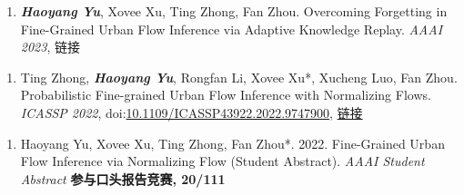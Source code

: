 
\begin{enumerate}[resume]
    \item  \textit{\textbf{Haoyang Yu}}, Xovee Xu, Ting Zhong, Fan Zhou. Overcoming Forgetting in Fine-Grained Urban Flow Inference via Adaptive Knowledge Replay. \textit{AAAI 2023}, 
     {\color{Green}链接}

\end{enumerate}



\begin{enumerate}[resume]
    \item Ting Zhong, \textit{\textbf{Haoyang Yu}}, Rongfan Li, Xovee Xu*, Xucheng Luo, Fan Zhou. Probabilistic Fine-grained Urban Flow Inference with Normalizing Flows. \textit{ICASSP 2022}, 
    doi:\href{papers/ICASSP_2022_FUFI.pdf}{10.1109/ICASSP43922.2022.9747900}, \href{https://ieeexplore.ieee.org/document/9747900}
    {\color{Green}链接}

\end{enumerate}


\begin{enumerate}[resume]
    \item Haoyang Yu, Xovee Xu, Ting Zhong, Fan Zhou*. 2022. Fine-Grained Urban Flow Inference via Normalizing Flow (Student Abstract). \textit{AAAI Student Abstract}
    \newline \textbf{\color{red}参与口头报告竞赛, 20/111}
\end{enumerate}